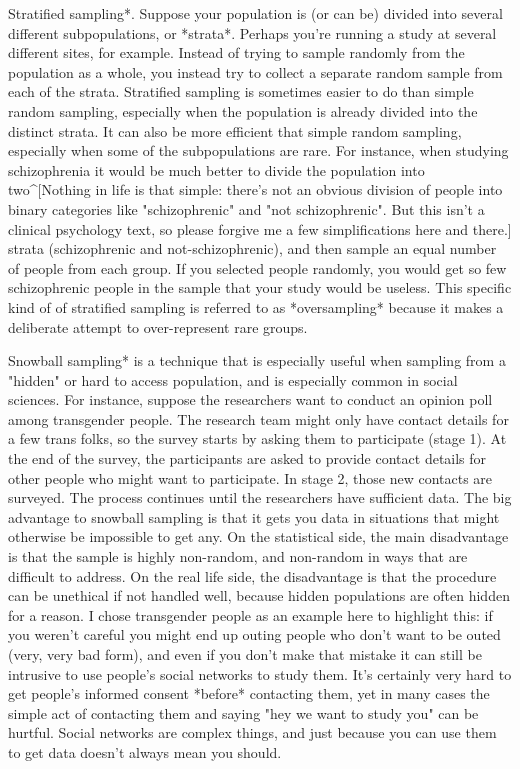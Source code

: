  
\item *Stratified sampling*. Suppose your population is (or can be) divided into several different subpopulations, or *strata*. Perhaps you're running a study at several different sites, for example. Instead of trying to sample randomly from the population as a whole, you instead try to collect a separate random sample from each of the strata. Stratified sampling is sometimes easier to do than simple random sampling, especially when the population is already divided into the distinct strata. It can also be more efficient that simple random sampling, especially when some of the subpopulations are rare. For instance, when studying schizophrenia it would be much better to divide the population into two^[Nothing in life is that simple: there's not an obvious division of people into binary categories like "schizophrenic" and "not schizophrenic". But this isn't a clinical psychology text, so please forgive me a few simplifications here and there.]  strata (schizophrenic and not-schizophrenic), and then sample an equal number of people from each group. If you selected people randomly, you would get so few schizophrenic people in the sample that your study would be useless. This specific kind of of stratified sampling is referred to as *oversampling* because it makes a deliberate attempt to over-represent rare groups. 
\item *Snowball sampling* is a technique that is especially useful when sampling from a "hidden" or hard to access population, and is especially common in social sciences. For instance, suppose the researchers want to conduct an opinion poll among transgender people. The research team might only have contact details for a few trans folks, so the survey starts by asking them to participate (stage 1). At the end of the survey, the participants are asked to provide contact details for other people who might want to participate. In stage 2, those new contacts are surveyed. The process continues until the researchers have sufficient data. The big advantage to snowball sampling is that it gets you data in situations that might otherwise be impossible to get any. On the statistical side, the main disadvantage is that the sample is highly non-random, and non-random in ways that are difficult to address. On the real life side, the disadvantage is that the procedure can be unethical if not handled well, because hidden populations are often hidden for a reason. I chose transgender people as an example here to highlight this: if you weren't careful you might end up outing people who don't want to be outed (very, very bad form), and even if you don't make that mistake it can still be intrusive to use people's social networks to study them. It's certainly very hard to get people's informed consent *before* contacting them, yet in many cases the simple act of contacting them and saying "hey we want to study you" can be hurtful. Social networks are complex things, and just because you can use them to get data doesn't always mean you should.
